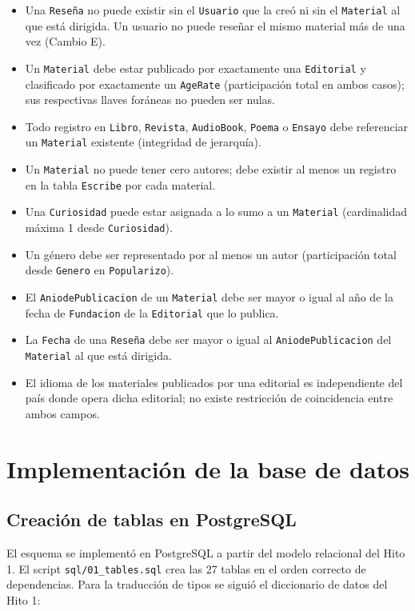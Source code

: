 \documentclass[12pt,a4paper]{article}
\begin{document}
\begin{itemize}
    \item Una \texttt{Reseña} no puede existir sin el \texttt{Usuario} que la creó ni sin el \texttt{Material} al que está dirigida. Un usuario no puede reseñar el mismo material más de una vez (Cambio E).
    \item Un \texttt{Material} debe estar publicado por exactamente una \texttt{Editorial} y clasificado por exactamente un \texttt{AgeRate} (participación total en ambos casos); sus respectivas llaves foráneas no pueden ser nulas.
    \item Todo registro en \texttt{Libro}, \texttt{Revista}, \texttt{AudioBook}, \texttt{Poema} o \texttt{Ensayo} debe referenciar un \texttt{Material} existente (integridad de jerarquía).
    \item Un \texttt{Material} no puede tener cero autores; debe existir al menos un registro en la tabla \texttt{Escribe} por cada material.
    \item Una \texttt{Curiosidad} puede estar asignada a lo sumo a un \texttt{Material} (cardinalidad máxima 1 desde \texttt{Curiosidad}).
    \item Un género debe ser representado por al menos un autor (participación total desde \texttt{Genero} en \texttt{Popularizo}).
    \item El \texttt{AniodePublicacion} de un \texttt{Material} debe ser mayor o igual al año de la fecha de \texttt{Fundacion} de la \texttt{Editorial} que lo publica.
    \item La \texttt{Fecha} de una \texttt{Reseña} debe ser mayor o igual al \texttt{AniodePublicacion} del \texttt{Material} al que está dirigida.
    \item El idioma de los materiales publicados por una editorial es independiente del país donde opera dicha editorial; no existe restricción de coincidencia entre ambos campos.
\end{itemize}


\section{Implementación de la base de datos}

\subsection{Creación de tablas en PostgreSQL}

El esquema se implementó en PostgreSQL a partir del modelo relacional del
Hito 1. El script \texttt{sql/01\_tables.sql} crea las 27 tablas en el orden
correcto de dependencias. Para la traducción de tipos se siguió el diccionario
de datos del Hito 1:
\end{document}
